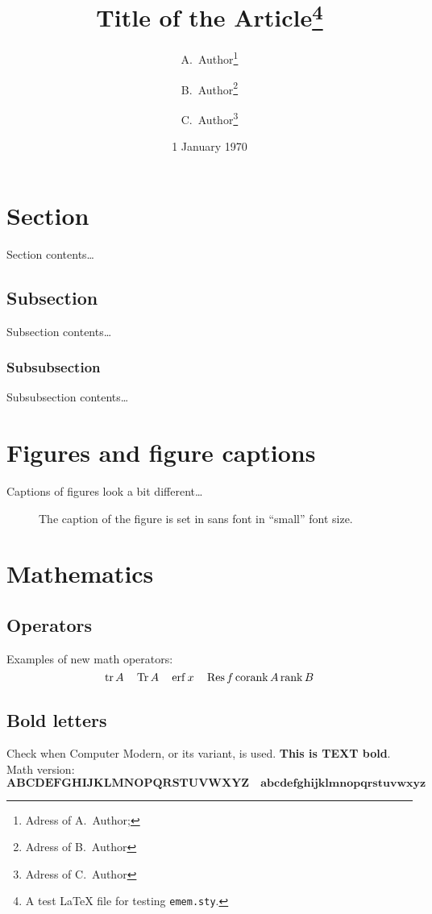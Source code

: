 \documentclass{article}
\title{Title of the Article\thanks{A test {\LaTeX} file for testing \texttt{emem.sty}.}}
\author{%
  A.~Author\thanks{Adress of A.~Author; \email{a.author@mail.zz}} \and%
  B.~Author\thanks{Adress of B.~Author} \and%
  C.~Author\thanks{Adress of C.~Author}%
}
\date{1 January 1970}
\begin{document}
\maketitle

\begin{abstract}
  \lipsum[1]
\end{abstract}

\section{Section}

Section contents\ldots \lipsum[1]

\subsection{Subsection}

Subsection contents\ldots \lipsum[2]

\subsubsection{Subsubsection}

Subsubsection contents\ldots \lipsum[3]

\section{Figures and figure captions}

Captions of figures look a bit different\ldots
\begin{figure}[h]
  \begin{center}
  \end{center}
  \caption{The caption of the figure is set in sans font in ``small'' font size.}
\end{figure}

\section{Mathematics}

\subsection{Operators}

Examples of new math operators:
\begin{equation}
  \operatorname{tr}{A}\quad \operatorname{Tr}{A}\quad \operatorname{erf}{x}\quad \operatorname{Res}{f} \operatorname{corank}{A} \operatorname{rank}{B}
\end{equation}

\subsection{Bold letters}

Check when Computer Modern, or its variant, is used. \textbf{This is TEXT bold}.  Math version:
\begin{equation}
  \mathbf{ABCDEFGHIJKLMNOPQRSTUVWXYZ}\quad \mathbf{abcdefghijklmnopqrstuvwxyz}
\end{equation}
\end{document}
